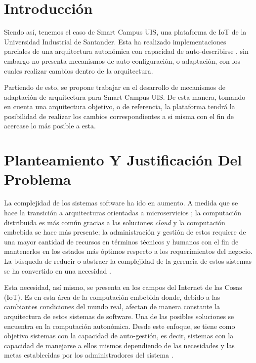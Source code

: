 \documentclass[12pt]{article}
\begin{document}
    
    
    \section{Introducción}


    
    Siendo así, tenemos el caso de Smart Campus UIS, una plataforma de IoT de la Universidad Industrial de Santander. Esta ha realizado implementaciones parciales de una arquitectura autonómica con capacidad de auto-describirse \cite{henry_2020}, sin embargo no presenta mecanismos de auto-configuración, o adaptación, con los cuales realizar cambios dentro de la arquitectura.
    
    Partiendo de esto, se propone trabajar en el desarrollo de mecanismos de adaptación de arquitectura para Smart Campus UIS. De esta manera, tomando en cuenta una arquitectura objetivo, o de referencia, la plataforma tendrá la posibilidad de realizar los cambios correspondientes a si misma con el fin de acercase lo más posible a esta.

    \section{Planteamiento Y Justificación Del Problema}

    La complejidad de los sistemas software ha ido en aumento. A medida que se hace la transición a arquitecturas orientadas a microservicios \cite{forrester_research_2019}; la computación distribuida es más común gracias a las soluciones \textit{cloud} \cite{the_cloud_in_2021} y la computación embebida se hace más presente;  la administración y gestión de estos requiere de una mayor cantidad de recursos en términos técnicos y humanos con el fin de mantenerlos en los estados más óptimos respecto a los requerimientos del negocio. La búsqueda de reducir o abstraer la complejidad de la gerencia de estos sistemas se ha convertido en una necesidad \cite{lalanda_diaconescu_mccann_2014}.

    Esta necesidad, así mismo, se presenta en los campos del Internet de las Cosas (IoT). Es en esta área de la computación embebida donde, debido a las cambiantes condiciones del mundo real, afectan de manera constante la arquitectura de estos sistemas de software. Una de las posibles soluciones se encuentra en la computación autonómica. Desde este enfoque, se tiene como objetivo sistemas con la capacidad de auto-gestión, es decir, sistemas con la capacidad de manejarse a ellos mismos dependiendo de las necesidades y las metas establecidas por los administradores del sistema \cite{evaluation_2004}.
    
\end{document}
